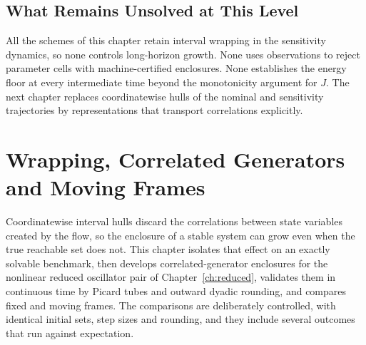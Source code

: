 \documentclass[11pt,notitlepage]{report}
\theoremstyle{definition}
\theoremstyle{remark}
\begin{document}
\section{What Remains Unsolved at This Level}
All the schemes of this chapter retain interval wrapping in the sensitivity dynamics, so none controls long-horizon growth. None uses observations to reject parameter cells with machine-certified enclosures. None establishes the energy floor at every intermediate time beyond the monotonicity argument for $J$. The next chapter replaces coordinatewise hulls of the nominal and sensitivity trajectories by representations that transport correlations explicitly.
\chapter{Wrapping, Correlated Generators and Moving Frames}\label{ch:frames}

Coordinatewise interval hulls discard the correlations between state variables created by the flow, so the enclosure of a stable system can grow even when the true reachable set does not. This chapter isolates that effect on an exactly solvable benchmark, then develops correlated-generator enclosures for the nonlinear reduced oscillator pair of Chapter~\ref{ch:reduced}, validates them in continuous time by Picard tubes and outward dyadic rounding, and compares fixed and moving frames. The comparisons are deliberately controlled, with identical initial sets, step sizes and rounding, and they include several outcomes that run against expectation.
\end{document}

